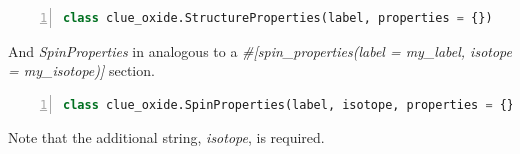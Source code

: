 \documentclass{book}
\begin{document}
\begin{lstlisting}[frame=single,numbers=left,language=python]
class clue_oxide.StructureProperties(label, properties = {})
\end{lstlisting}
And \textit{SpinProperties} in analogous to a 
\textit{\#[spin\_properties(label = my\_label, isotope = my\_isotope)]} section.
\begin{lstlisting}[frame=single,numbers=left,language=python]
class clue_oxide.SpinProperties(label, isotope, properties = {})
\end{lstlisting}
Note that the additional string, \textit{isotope}, is required.
\end{document}
